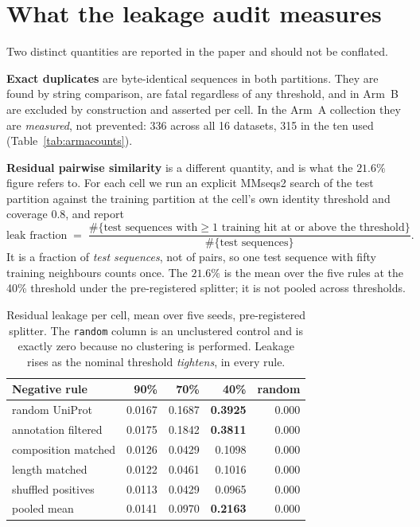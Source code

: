 \documentclass[11pt,a4paper]{article}
\begin{document}
\section{What the leakage audit measures}
\label{sec:leakdef}

Two distinct quantities are reported in the paper and should not be conflated.

\textbf{Exact duplicates} are byte-identical sequences in both partitions. They are found by
string comparison, are fatal regardless of any threshold, and in Arm~B are excluded by
construction and asserted per cell. In the Arm~A collection they are \emph{measured}, not
prevented: 336 across all 16 datasets, 315 in the ten used (Table~\ref{tab:armacounts}).

\textbf{Residual pairwise similarity} is a different quantity, and is what the $21.6\%$
figure refers to. For each cell we run an explicit MMseqs2 search of the test partition
against the training partition at the cell's own identity threshold and coverage $0.8$, and
report
\[
\text{leak fraction} \;=\;
\frac{\#\{\text{test sequences with} \geq 1 \text{ training hit at or above the threshold}\}}
     {\#\{\text{test sequences}\}} .
\]
It is a fraction of \emph{test sequences}, not of pairs, so one test sequence with fifty
training neighbours counts once. The $21.6\%$ is the mean over the five rules at the 40\%
threshold under the pre-registered splitter; it is not pooled across thresholds.

\begin{table}[htbp]\centering\small
\caption{Residual leakage per cell, mean over five seeds, pre-registered splitter. The
\texttt{random} column is an unclustered control and is exactly zero because no clustering
is performed. Leakage rises as the nominal threshold \emph{tightens}, in every rule.}
\label{tab:leakcell}
\begin{tabular}{lrrrr}
\toprule
Negative rule & 90\% & 70\% & 40\% & random \\
\midrule
random UniProt      & 0.0167 & 0.1687 & \textbf{0.3925} & 0.000 \\
annotation filtered & 0.0175 & 0.1842 & \textbf{0.3811} & 0.000 \\
composition matched & 0.0126 & 0.0429 & 0.1098 & 0.000 \\
length matched      & 0.0122 & 0.0461 & 0.1016 & 0.000 \\
shuffled positives  & 0.0113 & 0.0429 & 0.0965 & 0.000 \\
\midrule
pooled mean         & 0.0141 & 0.0970 & \textbf{0.2163} & 0.000 \\
\bottomrule
\end{tabular}
\end{table}
\end{document}
